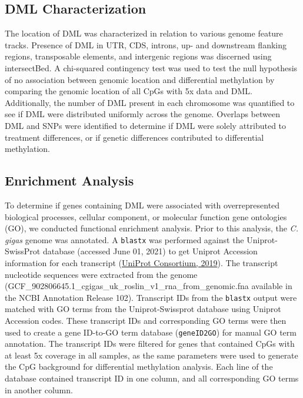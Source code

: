 \documentclass [11pt, proquest] {uwthesis}[2015/03/03]
\begin{document}
\hypertarget{dml-characterization}{%
\subsection{DML Characterization}\label{dml-characterization}}

The location of DML was characterized in relation to various genome feature tracks. Presence of DML in UTR, CDS, introns, up- and downstream flanking regions, transposable elements, and intergenic regions was discerned using intersectBed. A chi-squared contingency test was used to test the null hypothesis of no association between genomic location and differential methylation by comparing the genomic location of all CpGs with 5x data and DML. Additionally, the number of DML present in each chromosome was quantified to see if DML were distributed uniformly across the genome. Overlaps between DML and SNPs were identified to determine if DML were solely attributed to treatment differences, or if genetic differences contributed to differential methylation.

\hypertarget{enrichment-analysis}{%
\subsection{Enrichment Analysis}\label{enrichment-analysis}}

To determine if genes containing DML were associated with overrepresented biological processes, cellular component, or molecular function gene ontologies (GO), we conducted functional enrichment analysis. Prior to this analysis, the \emph{C. gigas} genome was annotated. A \texttt{blastx} was performed against the Uniprot-SwissProt database (accessed June 01, 2021) to get Uniprot Accession information for each transcript (\protect\hyperlink{ref-UniProt_Consortium2019}{UniProt Consortium, 2019}). The transcript nucleotide sequences were extracted from the genome (GCF\_902806645.1\_cgigas\_uk\_roslin\_v1\_rna\_from\_genomic.fna available in the NCBI Annotation Release 102). Transcript IDs from the \texttt{blastx} output were matched with GO terms from the Uniprot-Swissprot database using Uniprot Accession codes. These transcript IDs and corresponding GO terms were then used to create a gene ID-to-GO term database (\texttt{geneID2GO}) for manual GO term annotation. The transcript IDs were filtered for genes that contained CpGs with at least 5x coverage in all samples, as the same parameters were used to generate the CpG background for differential methylation analysis. Each line of the database contained transcript ID in one column, and all corresponding GO terms in another column.
\end{document}
